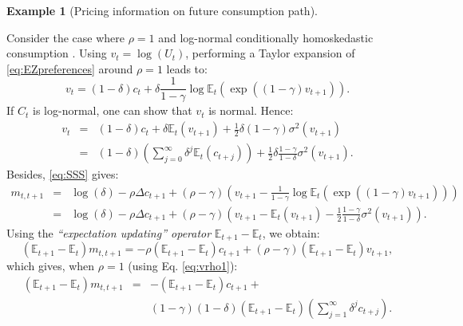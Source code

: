 \documentclass[
  12pt,
]{book}
\theoremstyle{definition}
\theoremstyle{definition}
\newtheorem{example}{Example}[chapter]
\theoremstyle{definition}
\theoremstyle{definition}
\theoremstyle{remark}
\begin{document}
\begin{example}[Pricing information on future consumption path]
\protect\hypertarget{exm:EZpricingInfo}{}\label{exm:EZpricingInfo}

Consider the case where \(\rho = 1\) and log-normal conditionally homoskedastic consumption \citep{Cochrane_2005}. Using \(v_t = \log(U_t)\), performing a Taylor expansion of \eqref{eq:EZpreferences} around \(\rho = 1\) leads to:
\begin{equation}
v_t = (1 - \delta) c_t + \delta \frac{1}{1 - \gamma} \log \mathbb{E}_t \left(\exp((1-\gamma)v_{t+1})\right).\label{eq:EZunitIES}
\end{equation}
If \(C_t\) is log-normal, one can show that \(v_t\) is normal. Hence:
\begin{eqnarray}
v_t &=& (1 - \delta) c_t + \delta \mathbb{E}_t(v_{t+1}) + \frac{1}{2}\delta (1-\gamma) \sigma^2(v_{t+1})\nonumber \\
&=& (1 - \delta) \left( \sum_{j=0}^{\infty}  \delta^j \mathbb{E}_t (c_{t+j}) \right) + \frac{1}{2}\delta \frac{1-\gamma}{1-\delta} \sigma^2(v_{t+1}) \label{eq:vrho1}.
\end{eqnarray}
Besides, \eqref{eq:SSS} gives:
\begin{eqnarray*}
m_{t,t+1} &=& \log(\delta) - \rho \Delta c_{t+1} + (\rho - \gamma) \left(v_{t+1} - \frac{1}{1 - \gamma} \log \mathbb{E}_t \left(\exp((1-\gamma)v_{t+1})\right)\right)\\
&=& \log(\delta) - \rho \Delta c_{t+1} + (\rho - \gamma) \left(v_{t+1} - \mathbb{E}_t(v_{t+1}) - \frac{1}{2} \frac{1-\gamma}{1-\delta} \sigma^2(v_{t+1})\right).
\end{eqnarray*}
Using the \emph{``expectation updating'' operator} \(\mathbb{E}_{t+1} - \mathbb{E}_t\), we obtain:
\[
(\mathbb{E}_{t+1} - \mathbb{E}_t) m_{t,t+1} = - \rho(\mathbb{E}_{t+1} - \mathbb{E}_t) c_{t+1} + (\rho - \gamma) (\mathbb{E}_{t+1} - \mathbb{E}_t) v_{t+1},
\]
which gives, when \(\rho = 1\) (using Eq. \eqref{eq:vrho1}):
\begin{eqnarray}
(\mathbb{E}_{t+1} - \mathbb{E}_t) m_{t,t+1} &=& - (\mathbb{E}_{t+1} - \mathbb{E}_t) c_{t+1} +  \\
&& (1 - \gamma)(1 - \delta) (\mathbb{E}_{t+1} - \mathbb{E}_t) \left(  \sum_{j=1}^{\infty}  \delta^j c_{t+j}  \right).\nonumber
\end{eqnarray}


\end{example}
\end{document}
